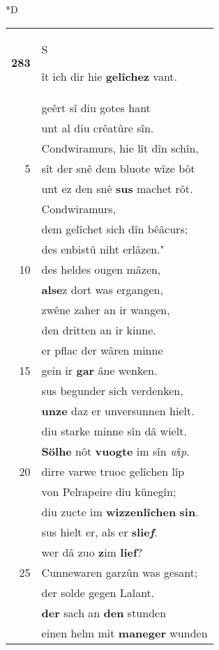 \documentclass[8pt,a4paper,notitlepage]{article}
\begin{document}
\begin{table}[ht]
\begin{minipage}[t]{0.5\linewidth}
\small
\begin{center}*D
\end{center}
\begin{tabular}{rl}
\textbf{283} & \begin{large}S\end{large}ît ich dir hie \textbf{gelîchez} vant.\\ 
 & geêrt sî diu gotes hant\\ 
 & unt al diu crêatûre sîn.\\ 
 & Condwiramurs, hie lît dîn schîn,\\ 
5 & sît der snê dem bluote wîze bôt\\ 
 & unt ez den snê \textbf{sus} machet rôt.\\ 
 & Condwiramurs,\\ 
 & dem gelîchet sich dîn bêâcurs;\\ 
 & des enbistû niht erlâzen."\\ 
10 & des heldes ougen mâzen,\\ 
 & \textbf{alse}z dort was ergangen,\\ 
 & zwêne zaher an ir wangen,\\ 
 & den dritten an ir kinne.\\ 
 & er pflac der wâren minne\\ 
15 & gein ir \textbf{gar} âne wenken.\\ 
 & sus begunder sich verdenken,\\ 
 & \textbf{unze} daz er unversunnen hielt.\\ 
 & diu starke minne sîn dâ wielt.\\ 
 & \textbf{Sölhe} nôt \textbf{vuogte} im sîn \textit{w}î\textit{p}.\\ 
20 & dirre varwe truoc gelîchen lîp\\ 
 & von Pelrapeire diu künegîn;\\ 
 & diu zucte im \textbf{wizzenlîchen} \textbf{sin}.\\ 
 & sus hielt er, als er \textbf{slie\textit{f}}.\\ 
 & wer dâ zuo \textbf{z}im \textbf{lief}?\\ 
25 & Cunnewaren garzûn was gesant;\\ 
 & der solde gegen Lalant.\\ 
 & \textbf{der} sach an \textbf{den} stunden\\ 
 & einen helm mit \textbf{maneger} wunden\\ 

\end{tabular}
\end{minipage}
\end{table}
\end{document}
